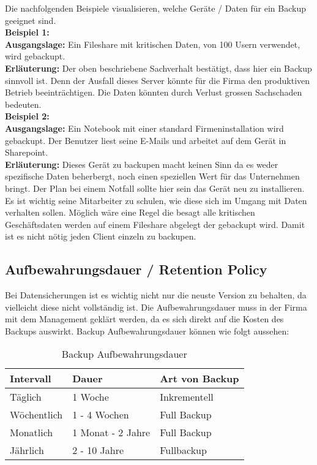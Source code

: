Die nachfolgenden Beispiele visualisieren, welche Geräte / Daten für ein Backup geeignet sind.\\


\textbf{Beispiel 1:}\\
\textbf{Ausgangslage:} Ein Fileshare mit kritischen Daten, von 100 Usern verwendet, wird gebackupt.\\
\textbf{Erläuterung:} Der oben beschriebene Sachverhalt bestätigt, dass hier ein Backup sinnvoll ist. Denn der Ausfall dieses Server könnte für die Firma den produktiven Betrieb beeinträchtigen. Die Daten könnten durch Verlust grossen Sachschaden bedeuten.\\


\textbf{Beispiel 2:}\\
\textbf{Ausgangslage:} Ein Notebook mit einer standard Firmeninstallation wird gebackupt. Der Benutzer liest seine E-Mails und arbeitet auf dem Gerät in Sharepoint.\\
\textbf{Erläuterung:} Dieses Gerät zu backupen macht keinen Sinn da es weder spezifische Daten beherbergt, noch einen speziellen Wert für das Unternehmen bringt. Der Plan bei einem Notfall sollte hier sein das Gerät neu zu installieren.\\

Es ist wichtig seine Mitarbeiter zu schulen, wie diese sich im Umgang mit Daten verhalten sollen.
Möglich wäre eine Regel die besagt alle kritischen Geschäftsdaten werden auf einem Fileshare abgelegt der gebackupt wird.
Damit ist es nicht nötig jeden Client einzeln zu backupen.

\subsection{Aufbewahrungsdauer / Retention Policy}
Bei Datensicherungen ist es wichtig nicht nur die neuste Version zu behalten, da vielleicht diese nicht vollständig ist.
Die Aufbewahrungsdauer muss in der Firma mit dem Management geklärt werden, da es sich direkt auf die Kosten des Backups auswirkt.
Backup Aufbewahrungsdauer können wie folgt aussehen:\\
\begin{table}[H]
    \begin{center}
        \begin{tabular}{l|l|l}
            \hline
            Intervall    & Dauer             & Art von Backup\\
            \hline
            Täglich      & 1 Woche           & Inkrementell\\
            Wöchentlich  & 1 - 4 Wochen      & Full Backup\\
            Monatlich    & 1 Monat - 2 Jahre & Full Backup\\
            Jährlich     & 2 - 10 Jahre      & Fullbackup\\
            \hline
        \end{tabular}
    \end{center}
    \caption{Backup Aufbewahrungsdauer}
\end{table}


